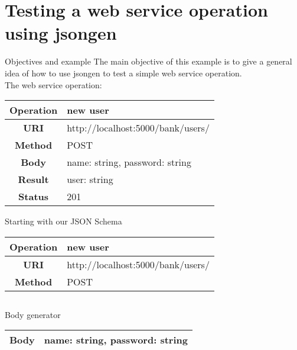 \section{Testing a web service operation using jsongen}


\begin{frame}{Objectives and example}
  The main objective of this example is to give a general idea of how
  to use jsongen to test a simple web service operation.\\

  The web service operation:\\

  \centering
  \begin{tabular}{| c | l |}
    \hline
    \textbf{Operation} & new user \\ \hline
    \textbf{URI}       & http://localhost:5000/bank/users/ \\ \hline
    \textbf{Method}    & POST     \\ \hline
    \textbf{Body}      & name: string, password: string \\ \hline
    \textbf{Result}    & user: string \\ \hline
    \textbf{Status}    & 201 \\ \hline
  \end{tabular}
  \centering
\end{frame}

\begin{frame}{Starting with our JSON Schema}
  \centering
  \begin{tabular}{| c | l |}
    \hline
    \textbf{Operation} & new user \\ \hline
    \textbf{URI}       & http://localhost:5000/bank/users/ \\ \hline
    \textbf{Method}    & POST     \\ \hline
  \end{tabular}
  \centering
  \inputminted{js}{./code/example1_op_description.jsch}
\end{frame}

\begin{frame}{Body generator}
  \centering
  \begin{tabular}{| c | l |}
    \hline
    \textbf{Body} & name: string, password: string \\ \hline
  \end{tabular}
  \centering
  \inputminted{js}{./code/example1_body.jsch}
\end{frame}

